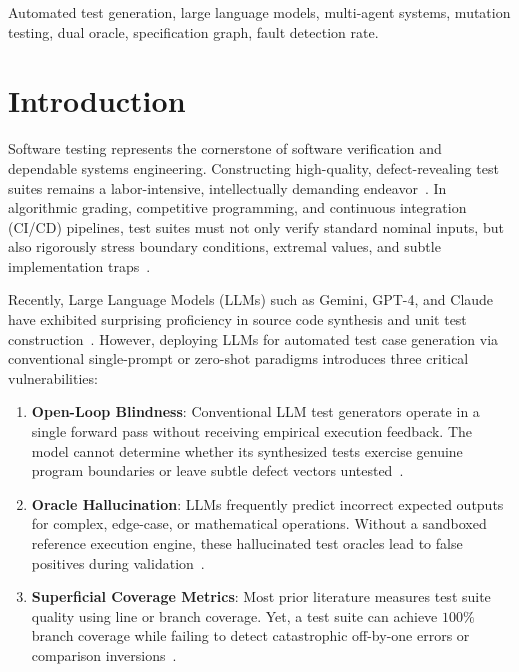 \documentclass[conference]{IEEEtran}
\begin{document}
\begin{IEEEkeywords}
Automated test generation, large language models, multi-agent systems, mutation testing, dual oracle, specification graph, fault detection rate.
\end{IEEEkeywords}

\section{Introduction}
\label{sec:intro}

Software testing represents the cornerstone of software verification and dependable systems engineering. Constructing high-quality, defect-revealing test suites remains a labor-intensive, intellectually demanding endeavor~\cite{siddiq2024}. In algorithmic grading, competitive programming, and continuous integration (CI/CD) pipelines, test suites must not only verify standard nominal inputs, but also rigorously stress boundary conditions, extremal values, and subtle implementation traps~\cite{wang2025benchmarking}.

Recently, Large Language Models (LLMs) such as Gemini, GPT-4, and Claude have exhibited surprising proficiency in source code synthesis and unit test construction~\cite{zheng2024,li2024llm}. However, deploying LLMs for automated test case generation via conventional single-prompt or zero-shot paradigms introduces three critical vulnerabilities:
\begin{enumerate}
    \item \textbf{Open-Loop Blindness}: Conventional LLM test generators operate in a single forward pass without receiving empirical execution feedback. The model cannot determine whether its synthesized tests exercise genuine program boundaries or leave subtle defect vectors untested~\cite{cai2025}.
    \item \textbf{Oracle Hallucination}: LLMs frequently predict incorrect expected outputs for complex, edge-case, or mathematical operations. Without a sandboxed reference execution engine, these hallucinated test oracles lead to false positives during validation~\cite{yang2025}.
    \item \textbf{Superficial Coverage Metrics}: Most prior literature measures test suite quality using line or branch coverage. Yet, a test suite can achieve $100\%$ branch coverage while failing to detect catastrophic off-by-one errors or comparison inversions~\cite{majumdar2024}.
\end{enumerate}
\end{document}
